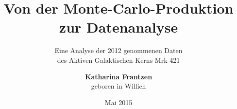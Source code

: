 









\newcommand{\thetitle}{Von der Monte-Carlo-Produktion zur Datenanalyse}
\newcommand{\thesubtitle}{Eine Analyse der 2012 genommenen Daten \\ des Aktiven Galaktischen Kerns Mrk 421}


\newcommand{\Geburtsort}{Willich}
\newcommand{\Jahr}{Mai 2015}
\newcommand{\Lehrstuhl}{Experimentelle Physik V}
\newcommand{\Betreuer}{Prof. Dr. Dr. Wolfgang Rhode}
\newcommand{\Zweitgutachter}{Prof. Dr. Carsten Westphal}
\newcommand{\Abgabedatum}{6. Mai 2015}

\author{
   \textbf{Katharina Frantzen}\\
   geboren in \Geburtsort
}

\titlehead{
   \texttt{[image: logos/tu-logo.pdf]}
}
\title{\thetitle}
\subtitle{\thesubtitle}

\date{\Jahr}

\subject{Arbeit zur Erlangung des akademischen Grades eines \\Doktors der Naturwissenschaften \\(Dr. rer. nat.)}
\publishers{Lehrstuhl für \Lehrstuhl \\ Fakultät Physik \\ Technische Universität Dortmund}



